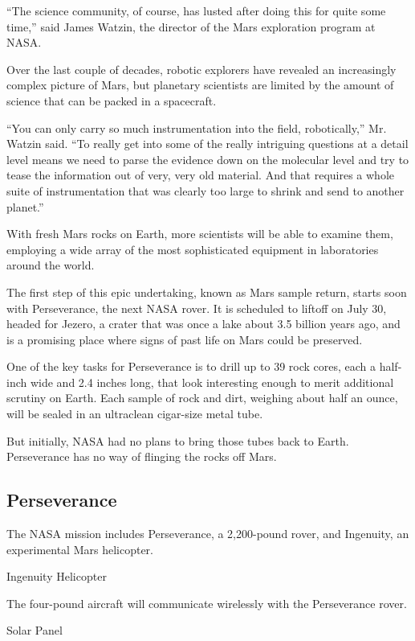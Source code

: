 ``The science community, of course, has lusted after doing this for
quite some time,'' said James Watzin, the director of the Mars
exploration program at NASA.

Over the last couple of decades, robotic explorers have revealed an
increasingly complex picture of Mars, but planetary scientists are
limited by the amount of science that can be packed in a spacecraft.

``You can only carry so much instrumentation into the field,
robotically,'' Mr. Watzin said. ``To really get into some of the really
intriguing questions at a detail level means we need to parse the
evidence down on the molecular level and try to tease the information
out of very, very old material. And that requires a whole suite of
instrumentation that was clearly too large to shrink and send to another
planet.''

With fresh Mars rocks on Earth, more scientists will be able to examine
them, employing a wide array of the most sophisticated equipment in
laboratories around the world.

The first step of this epic undertaking, known as Mars sample return,
starts soon with Perseverance, the next NASA rover. It is scheduled to
liftoff on July 30, headed for Jezero, a crater that was once a lake
about 3.5 billion years ago, and is a promising place where signs of
past life on Mars could be preserved.

One of the key tasks for Perseverance is to drill up to 39 rock cores,
each a half-inch wide and 2.4 inches long, that look interesting enough
to merit additional scrutiny on Earth. Each sample of rock and dirt,
weighing about half an ounce, will be sealed in an ultraclean cigar-size
metal tube.

But initially, NASA had no plans to bring those tubes back to Earth.
Perseverance has no way of flinging the rocks off Mars.

\hypertarget{perseverance}{%
\subsection{Perseverance}\label{perseverance}}

The NASA mission includes Perseverance, a 2,200-pound rover, and
Ingenuity, an experimental Mars helicopter.

Ingenuity Helicopter

The four-pound aircraft will communicate wirelessly with the
Perseverance rover.

Solar Panel

